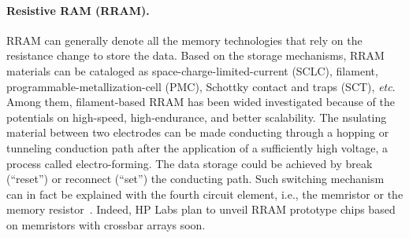 \paragraph{Resistive RAM (RRAM).} RRAM can generally denote all
the memory technologies that rely on the resistance change to
store the data. Based on the storage mechanisms, RRAM materials can be
cataloged as space-charge-limited-current (SCLC), filament,
programmable-metallization-cell (PMC), Schottky contact and traps (SCT), \textit{etc}.
Among them, filament-based RRAM has been wided investigated because of the potentials
on high-speed, high-endurance, and better scalability. The nsulating material between two electrodes can be made conducting
through a hopping or tunneling conduction path after the application of a sufficiently high voltage,
a process called electro-forming. The data storage could be achieved by break (``reset'') or reconnect (``set'') the conducting path.
Such switching mechanism can in fact be explained with the fourth circuit element,
i.e., the memristor or the memory resistor~\cite{Chua71,Tour08,Strukov08}. Indeed, HP Labs plan to unveil RRAM
prototype chips based on memristors with crossbar arrays soon.

